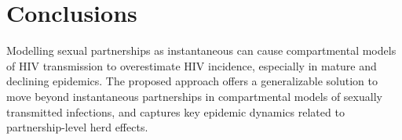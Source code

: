 \section{Conclusions}
Modelling sexual partnerships as instantaneous can cause
compartmental models of HIV transmission to overestimate HIV incidence,
especially in mature and declining epidemics.
The proposed approach offers a generalizable solution to move beyond instantaneous partnerships
in compartmental models of sexually transmitted infections,
and captures key epidemic dynamics related to partnership-level herd effects.
